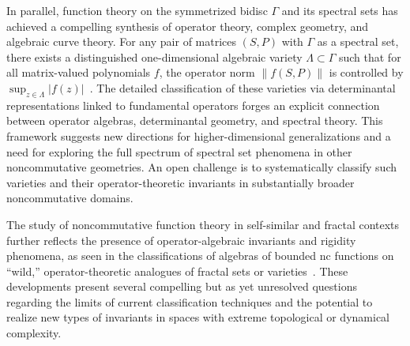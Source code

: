 \documentclass[sigconf]{acmart}
\begin{document}
In parallel, function theory on the symmetrized bidisc $\Gamma$ and its spectral sets has achieved a compelling synthesis of operator theory, complex geometry, and algebraic curve theory. For any pair of matrices $(S, P)$ with $\Gamma$ as a spectral set, there exists a distinguished one-dimensional algebraic variety $\Lambda \subset \Gamma$ such that for all matrix-valued polynomials $f$, the operator norm $\|f(S,P)\|$ is controlled by $\sup_{z \in \Lambda} |f(z)|$~\cite{ref99}. The detailed classification of these varieties via determinantal representations linked to fundamental operators forges an explicit connection between operator algebras, determinantal geometry, and spectral theory. This framework suggests new directions for higher-dimensional generalizations and a need for exploring the full spectrum of spectral set phenomena in other noncommutative geometries. An open challenge is to systematically classify such varieties and their operator-theoretic invariants in substantially broader noncommutative domains.

The study of noncommutative function theory in self-similar and fractal contexts further reflects the presence of operator-algebraic invariants and rigidity phenomena, as seen in the classifications of algebras of bounded nc functions on ``wild,'' operator-theoretic analogues of fractal sets or varieties~\cite{ref98,ref14}. These developments present several compelling but as yet unresolved questions regarding the limits of current classification techniques and the potential to realize new types of invariants in spaces with extreme topological or dynamical complexity.
\end{document}
